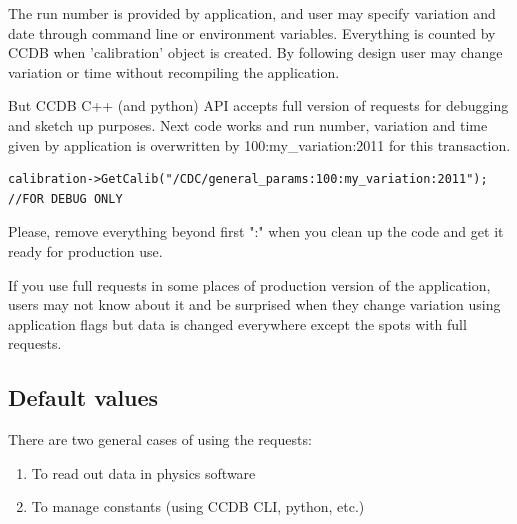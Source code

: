 \documentclass{article}
\begin{document}
The run number is provided by application, and user may specify variation and date
through command line or environment variables. Everything is counted by CCDB when
 'calibration' object is created. By following design user may change variation or time without recompiling the application.

 
But CCDB C++ (and python) API accepts full version of requests for debugging and  sketch up purposes. Next code works and run number, variation and time given by application is overwritten by 100:my\_variation:2011 for this transaction. 
\begin{verbatim}
calibration->GetCalib("/CDC/general_params:100:my_variation:2011"); //FOR DEBUG ONLY
\end{verbatim}
Please, remove everything beyond first ":" when you clean up the code and get it ready for production use.

If you use full requests in some places of production version of the application, users may not know about it and be surprised when they change variation using application flags but data is changed everywhere except the spots with full requests.


%
%




\subsection{Default values}

There are two general cases of using the requests:
\begin{enumerate}
  \item To read out data in physics software 
  \item To manage constants (using CCDB CLI, python, etc.)
\end{enumerate}
\vspace{1 em}
\end{document}
